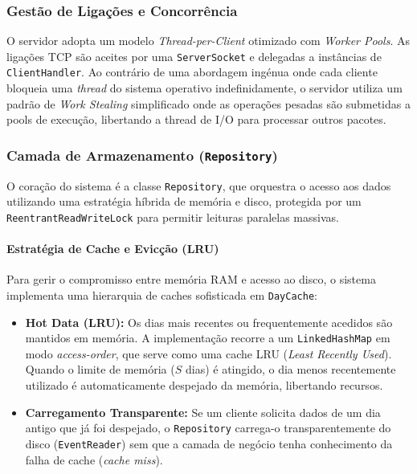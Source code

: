\documentclass{article}
\begin{document}
\subsubsection{Gestão de Ligações e Concorrência}
O servidor adopta um modelo \textit{Thread-per-Client} otimizado com \textit{Worker Pools}. As ligações TCP são aceites por uma \texttt{ServerSocket} e delegadas a instâncias de \texttt{ClientHandler}. Ao contrário de uma abordagem ingénua onde cada cliente bloqueia uma \textit{thread} do sistema operativo indefinidamente, o servidor utiliza um padrão de \textit{Work Stealing} simplificado onde as operações pesadas são submetidas a pools de execução, libertando a thread de I/O para processar outros pacotes.

\subsubsection{Camada de Armazenamento (\texttt{Repository})}
O coração do sistema é a classe \texttt{Repository}, que orquestra o acesso aos dados utilizando uma estratégia híbrida de memória e disco, protegida por um \texttt{ReentrantReadWriteLock} para permitir leituras paralelas massivas.

\paragraph{Estratégia de Cache e Evicção (LRU)}
Para gerir o compromisso entre memória RAM e acesso ao disco, o sistema implementa uma hierarquia de caches sofisticada em \texttt{DayCache}:
\begin{itemize}
    \item \textbf{Hot Data (LRU):} Os dias mais recentes ou frequentemente acedidos são mantidos em memória. A implementação recorre a um \texttt{LinkedHashMap} em modo \textit{access-order}, que serve como uma cache LRU (\textit{Least Recently Used}). Quando o limite de memória ($S$ dias) é atingido, o dia menos recentemente utilizado é automaticamente despejado da memória, libertando recursos.
    \item \textbf{Carregamento Transparente:} Se um cliente solicita dados de um dia antigo que já foi despejado, o \texttt{Repository} carrega-o transparentemente do disco (\texttt{EventReader}) sem que a camada de negócio tenha conhecimento da falha de cache (\textit{cache miss}).
\end{itemize}
\end{document}
